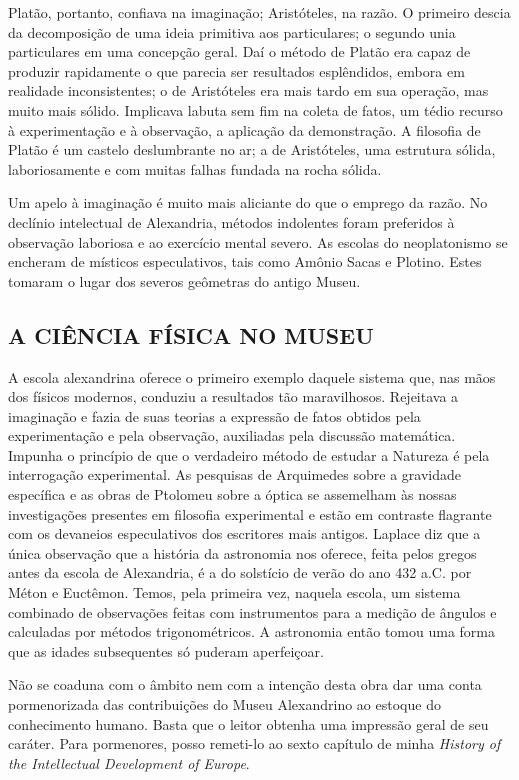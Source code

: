 \documentclass[11pt,a5paper,twoside,openany]{book}
\begin{document}
Platão, portanto, confiava na imaginação; Aristóteles, na razão. O primeiro descia da decomposição de uma ideia primitiva aos particulares; o segundo unia particulares em uma concepção geral. Daí o método de Platão era capaz de produzir rapidamente o que parecia ser resultados esplêndidos, embora em realidade inconsistentes; o de Aristóteles era mais tardo em sua operação, mas muito mais sólido. Implicava labuta sem fim na coleta de fatos, um tédio recurso à experimentação e à observação, a aplicação da demonstração. A filosofia de Platão é um castelo deslumbrante no ar; a de Aristóteles, uma estrutura sólida, laboriosamente e com muitas falhas fundada na rocha sólida.

Um apelo à imaginação é muito mais aliciante do que o emprego da razão. No declínio intelectual de Alexandria, métodos indolentes foram preferidos à observação laboriosa e ao exercício mental severo. As escolas do neoplatonismo se encheram de místicos especulativos, tais como Amônio Sacas e Plotino. Estes tomaram o lugar dos severos geômetras do antigo Museu.

\subsection*{A CIÊNCIA FÍSICA NO MUSEU}
A escola alexandrina oferece o primeiro exemplo daquele sistema que, nas mãos dos físicos modernos, conduziu a resultados tão maravilhosos. Rejeitava a imaginação e fazia de suas teorias a expressão de fatos obtidos pela experimentação e pela observação, auxiliadas pela discussão matemática. Impunha o princípio de que o verdadeiro método de estudar a Natureza é pela interrogação experimental. As pesquisas de Arquimedes sobre a gravidade específica e as obras de Ptolomeu sobre a óptica se assemelham às nossas investigações presentes em filosofia experimental e estão em contraste flagrante com os devaneios especulativos dos escritores mais antigos. Laplace diz que a única observação que a história da astronomia nos oferece, feita pelos gregos antes da escola de Alexandria, é a do solstício de verão do ano 432 a.C. por Méton e Euctêmon. Temos, pela primeira vez, naquela escola, um sistema combinado de observações feitas com instrumentos para a medição de ângulos e calculadas por métodos trigonométricos. A astronomia então tomou uma forma que as idades subsequentes só puderam aperfeiçoar.

Não se coaduna com o âmbito nem com a intenção desta obra dar uma conta pormenorizada das contribuições do Museu Alexandrino ao estoque do conhecimento humano. Basta que o leitor obtenha uma impressão geral de seu caráter. Para pormenores, posso remeti-lo ao sexto capítulo de minha \textit{History of the Intellectual Development of Europe}.
\end{document}
